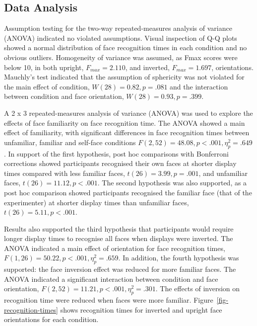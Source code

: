 \documentclass[
  authoryear,
  review,
  3p,
  onecolumn]{elsarticle}
\begin{document}
\subsection{Data Analysis}\label{data-analysis}

Assumption testing for the two-way repeated-measures analysis of
variance (ANOVA) indicated no violated assumptions. Visual inspection of
Q-Q plots showed a normal distribution of face recognition times in each
condition and no obvious outliers. Homogeneity of variance was assumed,
as Fmax scores were below 10, in both upright, \(F_{max} = 2.110\), and
inverted, \(F_{max} = 1.697\), orientations. Mauchly's test indicated
that the assumption of sphericity was not violated for the main effect
of condition, \(W(28) = 0.82, p = .081\) and the interaction between
condition and face orientation, \(W(28) = 0.93, p = .399\).

A 2 x 3 repeated-measures analysis of variance (ANOVA) was used to
explore the effects of face familiarity on face recognition time. The
ANOVA showed a main effect of familiarity, with significant differences
in face recognition times between unfamiliar, familiar and self-face
conditions \(F(2, 52) = 48.08, p < .001, \eta_p^2 = .649\). In support
of the first hypothesis, post hoc comparisons with Bonferroni
corrections showed participants recognised their own faces at shorter
display times compared with less familiar faces,
\(t(26) = 3.99, p = .001\), and unfamiliar faces,
\(t(26) = 11.12, p < .001\). The second hypothesis was also supported,
as a post hoc comparison showed participants recognised the familiar
face (that of the experimenter) at shorter display times than unfamiliar
faces, \(t(26) = 5.11, p < .001\).

Results also supported the third hypothesis that participants would
require longer display times to recognise all faces when displays were
inverted. The ANOVA indicated a main effect of orientation for face
recognition times, \(F(1, 26) = 50.22, p <.001, \eta_p^2 = .659\). In
addition, the fourth hypothesis was supported: the face inversion effect
was reduced for more familiar faces. The ANOVA indicated a significant
interaction between condition and face orientation,
\(F(2, 52) = 11.21, p < .001, \eta_p^2 = .301\). The effects of
inversion on recognition time were reduced when faces were more
familiar. Figure~\ref{fig-recognition-times} shows recognition times for
inverted and upright face orientations for each condition.
\end{document}
